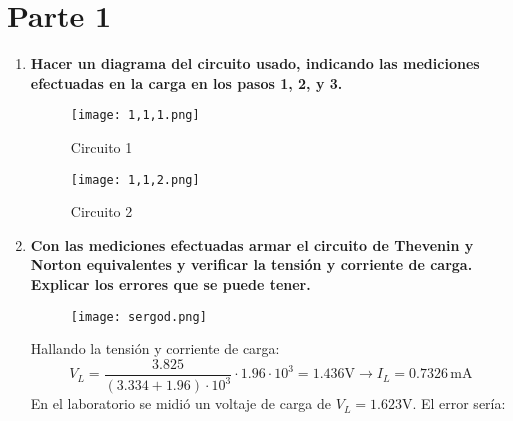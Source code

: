 \documentclass[a4paper,11pt]{report}
\begin{document}
\section{Parte 1}
\begin{enumerate}[label=\arabic*),font=\bfseries]
\item \textbf{Hacer un diagrama del circuito usado, indicando las mediciones efectuadas en la carga en los pasos 1, 2, y 3.}
\begin{figure}[H]
\begin{center}
\texttt{[image: 1,1,1.png]}
\caption{Circuito 1}
\end{center}
\end{figure}
\begin{figure}[H]
\begin{center}
\texttt{[image: 1,1,2.png]}
\caption{Circuito 2}
\end{center}
\end{figure}
\item \textbf{Con las mediciones efectuadas armar el circuito de Thevenin y Norton equivalentes y verificar la tensión y corriente de  carga. Explicar los errores que se puede tener.}
\begin{figure}[H]
\centering
{}
\end{figure}
\begin{figure}[H]
\centering
\texttt{[image: sergod.png]}
\end{figure}
Hallando la tensión y corriente de carga:
$$
V_{L} = \frac{3.825}{(3.334+1.96)\cdot 10^{3}}\cdot 1.96\cdot 10^{3} = 1.436 \mathrm{V} \longrightarrow I_{L} = 0.7326\,\mathrm{mA}
$$
En el laboratorio se midió un voltaje de carga de $V_{L} = 1.623$V. El error sería:

\end{enumerate}
\end{document}
